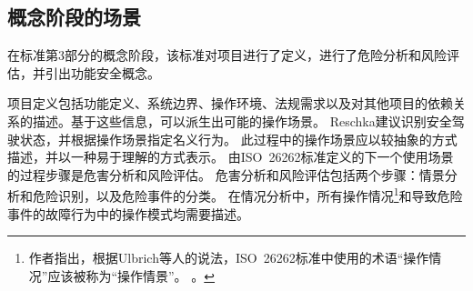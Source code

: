\subsection{概念阶段的场景}
在标准第3部分的概念阶段，该标准对项目进行了定义，进行了危险分析和风险评估，并引出功能安全概念。

项目定义包括功能定义、系统边界、操作环境、法规需求以及对其他项目的依赖关系的描述。基于这些信息，可以派生出可能的操作场景。
Reschka\cite {Reschka2016}建议识别安全驾驶状态，并根据操作场景指定名义行为。
此过程中的操作场景应以较抽象的方式描述，并以一种易于理解的方式表示。
由ISO~26262标准定义的下一个使用场景的过程步骤是危害分析和风险评估。
危害分析和风险评估包括两个步骤：情景分析和危险识别，以及危险事件的分类。
在情况分析中，所有操作情况\footnote{作者指出，根据Ulbrich等人的说法，ISO~26262标准中使用的术语“操作情况”应该被称为“操作情景”。 \cite{ulbrich_definition_2015}。}和导致危险事件的故障行为中的操作模式均需要描述。
